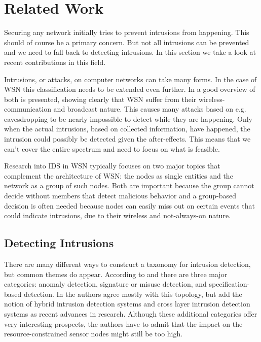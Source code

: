\documentclass[conference]{IEEEtran}
\begin{document}
\section{Related Work}
\label{section:related}

Securing any network initially tries to prevent intrusions from happening. This
should of course be a primary concern. But not all intrusions can be prevented
and we need to fall back to detecting intrusions. In this section we take a
look at recent contributions in this field.

Intrusions, or attacks, on computer networks can take many forms. In the case
of WSN this classification needs to be extended even further. In
\cite{padmavathi2009survey} a good overview of both is presented, showing
clearly that WSN suffer from their wireless-communication and broadcast nature.
This causes many attacks based on e.g. eavesdropping to be nearly impossible to
detect while they are happening. Only when the actual intrusions, based on
collected information, have happened, the intrusion could possibly be detected
given the after-effects. This means that we can't cover the entire spectrum and
need to focus on what is feasible.

Research into IDS in WSN typically focuses on two major topics that complement
the architecture of WSN: the nodes as single entities and the network as a
group of such nodes. Both are important because the group cannot decide without
members that detect malicious behavior and a group-based decision is often
needed because nodes can easily miss out on certain events that could indicate
intrusions, due to their wireless and not-always-on nature.

\subsection{Detecting Intrusions}
\label{subsection:detecting}

There are many different ways to construct a taxonomy for intrusion detection,
but common themes do appear. According to \cite{mishra2004intrusion} and
\cite{ioannis2007towards} there are three major categories: anomaly detection,
signature or misuse detection, and specification-based detection. In
\cite{alrajeh2013intrusion} the authors agree mostly with this topology, but
add the notion of hybrid intrusion detection systems and cross layer intrusion
detection systems as recent advances in research. Although these additional
categories offer very interesting prospects, the authors have to admit that the
impact on the resource-constrained sensor nodes might still be too high.
\end{document}
